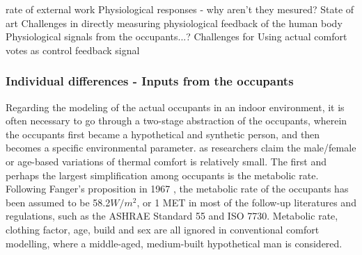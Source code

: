 	rate of external work
        Physiological responses - why aren't they mesured?
        State of art
        Challenges in directly measuring physiological feedback of the human body
	Physiological signals from the occupants...?
	    Challenges for Using actual comfort votes as control feedback signal

\subsubsection{Individual differences - Inputs from the occupants}
	Regarding the modeling of the actual occupants in an indoor environment, it is often necessary to go through a two-stage abstraction of the occupants, wherein the occupants first became a hypothetical and synthetic person, and then becomes a specific environmental parameter.  as researchers claim the male/female or age-based variations of thermal comfort is relatively small. 
	The first and perhaps the largest simplification among occupants is the metabolic rate. Following Fanger's proposition in 1967 \cite{fanger_calculation_1967}, the metabolic rate of the occupants has been assumed to be 58.2$W/m^2$, or 1 MET in most of the follow-up literatures and regulations, such as the ASHRAE Standard 55\cite{ashrae_ansi/ashrae_2013} and ISO 7730\cite{iso_iso_2005}.
    Metabolic rate, clothing factor, age, build and sex are all ignored in conventional comfort modelling, where a middle-aged, medium-built hypothetical man is considered.
